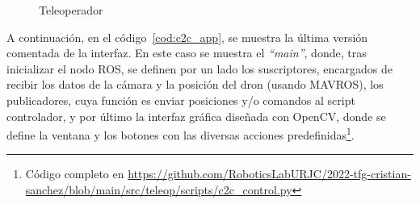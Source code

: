 \begin{figure} [t]
	\centering
	\quad
    \quad
	\caption{Teleoperador}
	\label{fig:teleop_figs}
\end{figure}

A continuación, en el código~\ref{cod:c2c_app}, se muestra la última versión comentada de la interfaz. En este caso se muestra el \emph{``main''}, donde, tras inicializar el nodo \ac{ROS}, se definen por un lado los suscriptores, encargados de recibir los datos de la cámara y la posición del dron (usando MAVROS), los publicadores, cuya función es enviar posiciones y/o comandos al script controlador, y por último la interfaz gráfica diseñada con OpenCV, donde se define la ventana y los botones con las diversas acciones predefinidas\footnote[2]{Código completo en \url{https://github.com/RoboticsLabURJC/2022-tfg-cristian-sanchez/blob/main/src/teleop/scripts/c2c_control.py}}.\\

